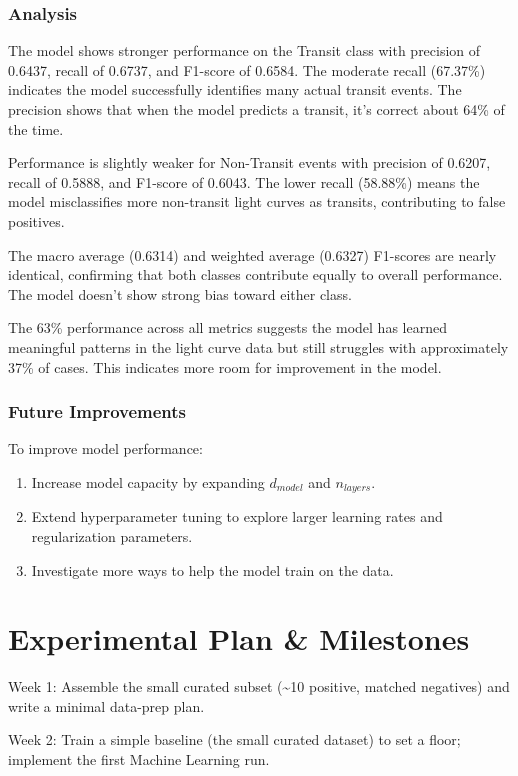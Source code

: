 \documentclass[letterpaper]{article} %
\begin{document}
\subsubsection*{Analysis}

The model shows stronger performance on the Transit class with precision of 0.6437, recall of 0.6737, and F1-score of 0.6584. The moderate recall (67.37\%) indicates the model successfully identifies many actual transit events. The precision shows that when the model predicts a transit, it's correct about 64\% of the time.

Performance is slightly weaker for Non-Transit events with precision of 0.6207, recall of 0.5888, and F1-score of 0.6043. The lower recall (58.88\%) means the model misclassifies more non-transit light curves as transits, contributing to false positives.

The macro average (0.6314) and weighted average (0.6327) F1-scores are nearly identical, confirming that both classes contribute equally to overall performance. The model doesn't show strong bias toward either class.

The 63\% performance across all metrics suggests the model has learned meaningful patterns in the light curve data but still struggles with approximately 37\% of cases. This indicates more room for improvement in the model. 

\subsubsection*{Future Improvements}

To improve model performance:
\begin{enumerate}
    \item Increase model capacity by expanding \(d_{model}\) and \(n_{layers}\).
    \item Extend hyperparameter tuning to explore larger learning rates and regularization parameters.
    \item Investigate more ways to help the model train on the data.
\end{enumerate}


\section*{Experimental Plan \& Milestones}
Week 1: Assemble the small curated subset (\textasciitilde{}10 positive, matched negatives) and write a minimal data-prep plan.

Week 2: Train a simple baseline (the small curated dataset) to set a floor; implement the first Machine Learning run.
\end{document}
